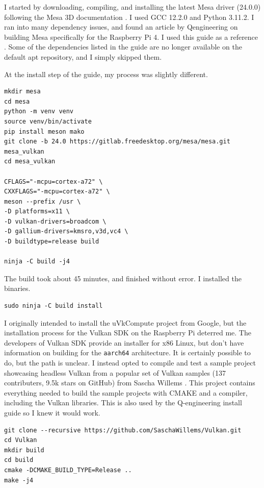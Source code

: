 \documentclass[12pt]{article}
\begin{document}
I started by downloading, compiling, and installing the latest Mesa driver (24.0.0) following the Mesa 3D documentation \cite{mesa3d}. I used GCC 12.2.0 and Python 3.11.2. I ran into many dependency issues, and found an article by Qengineering on building Mesa specifically for the Raspberry Pi 4. I used this guide as a reference \cite{q-engineering}. Some of the dependencies listed in the guide are no longer available on the default apt repository, and I simply skipped them.

At the install step of the guide, my process was slightly different.

\begin{lstlisting}
mkdir mesa
cd mesa
python -m venv venv
source venv/bin/activate
pip install meson mako
git clone -b 24.0 https://gitlab.freedesktop.org/mesa/mesa.git mesa_vulkan
cd mesa_vulkan

CFLAGS="-mcpu=cortex-a72" \
CXXFLAGS="-mcpu=cortex-a72" \
meson --prefix /usr \
-D platforms=x11 \
-D vulkan-drivers=broadcom \
-D gallium-drivers=kmsro,v3d,vc4 \
-D buildtype=release build

ninja -C build -j4
\end{lstlisting}

The build took about 45 minutes, and finished without error. I installed the binaries.

\begin{lstlisting}
sudo ninja -C build install
\end{lstlisting}

I originally intended to install the uVkCompute project from Google, but the installation process for the Vulkan SDK on the Raspberry Pi deterred me. The developers of Vulkan SDK provide an installer for x86 Linux, but don't have information on building for the \verb|aarch64| architecture. It is certainly possible to do, but the path is unclear. I instead opted to compile and test a sample project showcasing headless Vulkan from a popular set of Vulkan samples (137 contributers, 9.5k stars on GitHub) from Sascha Willems \cite{willems2024}. This project contains everything needed to build the sample projects with CMAKE and a compiler, including the Vulkan libraries. This is also used by the Q-engineering install guide \cite{q-engineering} so I knew it would work.

\begin{lstlisting}
git clone --recursive https://github.com/SaschaWillems/Vulkan.git
cd Vulkan
mkdir build
cd build
cmake -DCMAKE_BUILD_TYPE=Release ..
make -j4
\end{lstlisting}
\end{document}
